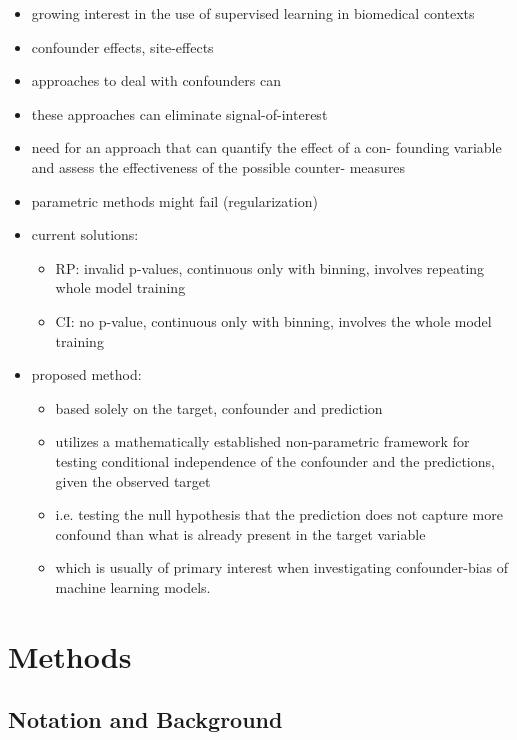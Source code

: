 \documentclass{article}
\begin{document}
\begin{itemize}
    \item growing interest in the use of
supervised learning in biomedical contexts
    \item confounder effects, site-effects
    \item approaches to deal with confounders can
    \item these approaches can eliminate signal-of-interest
    \item need for an approach that can quantify the effect of a con- founding variable and assess the effectiveness of the possible counter- measures
    \item parametric methods might fail (regularization)
    \item current solutions:
    \begin{itemize}
        \item RP: invalid p-values, continuous only with binning, involves repeating whole model training
        \item CI: no p-value, continuous only with binning, involves the whole model training
    \end{itemize}
    \item proposed method:
    \begin{itemize}
        \item based solely on the target, confounder and prediction
        \item utilizes a mathematically established non-parametric framework for testing conditional independence of the confounder and the predictions, given the observed target
        \item i.e. testing the null hypothesis that the prediction does not capture more confound than what is already present in the target variable
        \item which is usually of primary interest when investigating confounder-bias of machine learning models.
    \end{itemize}
\end{itemize}

\section{Methods}

\subsection{Notation and Background}
\end{document}
